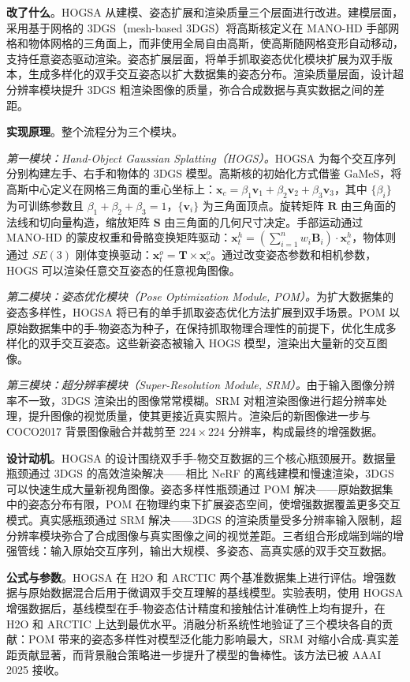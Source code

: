 \textbf{改了什么}。HOGSA 从建模、姿态扩展和渲染质量三个层面进行改进。建模层面，采用基于网格的 3DGS（mesh-based 3DGS）将高斯核定义在 MANO-HD 手部网格和物体网格的三角面上，而非使用全局自由高斯，使高斯随网格变形自动移动，支持任意姿态驱动渲染。姿态扩展层面，将单手抓取姿态优化模块扩展为双手版本，生成多样化的双手交互姿态以扩大数据集的姿态分布。渲染质量层面，设计超分辨率模块提升 3DGS 粗渲染图像的质量，弥合合成数据与真实数据之间的差距。

\textbf{实现原理}。整个流程分为三个模块。

\emph{第一模块：Hand-Object Gaussian Splatting（HOGS）。}HOGSA 为每个交互序列分别构建左手、右手和物体的 3DGS 模型。高斯核的初始化方式借鉴 GaMeS，将高斯中心定义在网格三角面的重心坐标上：$\mathbf{x}_c = \beta_1 \mathbf{v}_1 + \beta_2 \mathbf{v}_2 + \beta_3 \mathbf{v}_3$，其中 $\{\beta_i\}$ 为可训练参数且 $\beta_1 + \beta_2 + \beta_3 = 1$，$\{\mathbf{v}_i\}$ 为三角面顶点。旋转矩阵 $\mathbf{R}$ 由三角面的法线和切向量构造，缩放矩阵 $\mathbf{S}$ 由三角面的几何尺寸决定。手部运动通过 MANO-HD 的蒙皮权重和骨骼变换矩阵驱动：$\mathbf{x}_t^h = (\sum_{i=1}^{n} w_i \mathbf{B}_i) \cdot \mathbf{x}_c^h$，物体则通过 $SE(3)$ 刚体变换驱动：$\mathbf{x}_t^o = \mathbf{T} \times \mathbf{x}_c^o$。通过改变姿态参数和相机参数，HOGS 可以渲染任意交互姿态的任意视角图像。

\emph{第二模块：姿态优化模块（Pose Optimization Module, POM）。}为扩大数据集的姿态多样性，HOGSA 将已有的单手抓取姿态优化方法扩展到双手场景。POM 以原始数据集中的手-物姿态为种子，在保持抓取物理合理性的前提下，优化生成多样化的双手交互姿态。这些新姿态被输入 HOGS 模型，渲染出大量新的交互图像。

\emph{第三模块：超分辨率模块（Super-Resolution Module, SRM）。}由于输入图像分辨率不一致，3DGS 渲染出的图像常常模糊。SRM 对粗渲染图像进行超分辨率处理，提升图像的视觉质量，使其更接近真实照片。渲染后的新图像进一步与 COCO2017 背景图像融合并裁剪至 $224 \times 224$ 分辨率，构成最终的增强数据。

\textbf{设计动机}。HOGSA 的设计围绕双手手-物交互数据的三个核心瓶颈展开。数据量瓶颈通过 3DGS 的高效渲染解决——相比 NeRF 的离线建模和慢速渲染，3DGS 可以快速生成大量新视角图像。姿态多样性瓶颈通过 POM 解决——原始数据集中的姿态分布有限，POM 在物理约束下扩展姿态空间，使增强数据覆盖更多交互模式。真实感瓶颈通过 SRM 解决——3DGS 的渲染质量受多分辨率输入限制，超分辨率模块弥合了合成图像与真实图像之间的视觉差距。三者组合形成端到端的增强管线：输入原始交互序列，输出大规模、多姿态、高真实感的双手交互数据。

\textbf{公式与参数}。HOGSA 在 H2O 和 ARCTIC 两个基准数据集上进行评估。增强数据与原始数据混合后用于微调双手交互理解的基线模型。实验表明，使用 HOGSA 增强数据后，基线模型在手-物姿态估计精度和接触估计准确性上均有提升，在 H2O 和 ARCTIC 上达到最优水平。消融分析系统性地验证了三个模块各自的贡献：POM 带来的姿态多样性对模型泛化能力影响最大，SRM 对缩小合成-真实差距贡献显著，而背景融合策略进一步提升了模型的鲁棒性。该方法已被 AAAI 2025 接收。

